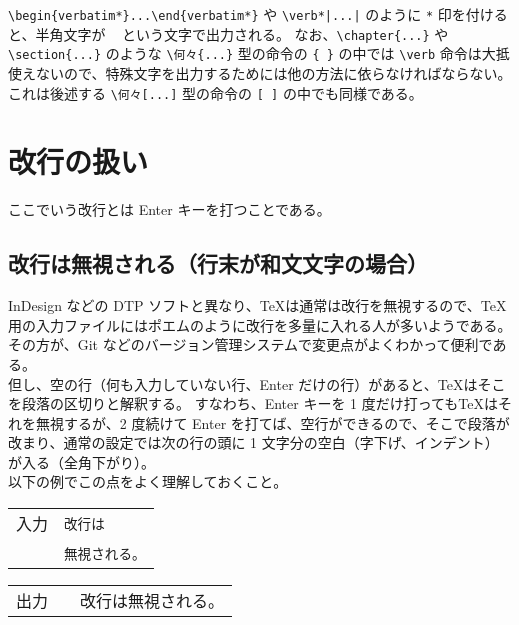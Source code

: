 \verb'\begin{verbatim*}...\end{verbatim*}' や \verb'\verb*|...|' のように \verb'*' 印を付けると、半角文字が \verb*' ' という文字で出力される。
なお、\verb'\chapter{...}' や \verb'\section{...}' のような \verb'\何々{...}' 型の命令の \verb'{ }' の中では \verb'\verb' 命令は大抵使えないので、特殊文字を出力するためには他の方法に依らなければならない。
これは後述する \verb'\何々[...]' 型の命令の \verb'[ ]' の中でも同様である。
\section{改行の扱い}
ここでいう改行とは Enter キーを打つことである。
\subsection{改行は無視される（行末が和文文字の場合）}
InDesign などの DTP ソフトと異なり、\TeX{}は通常は改行を無視するので、\TeX{}用の入力ファイルにはポエムのように改行を多量に入れる人が多いようである。
その方が、Git などのバージョン管理システムで変更点がよくわかって便利である。\\

但し、空の行（何も入力していない行、Enter だけの行）があると、\TeX{}はそこを段落の区切りと解釈する。
すなわち、Enter キーを 1 度だけ打っても\TeX{}はそれを無視するが、2 度続けて Enter を打てば、空行ができるので、そこで段落が改まり、通常の設定では次の行の頭に 1 文字分の空白（字下げ、インデント）が入る（全角下がり）。\\

以下の例でこの点をよく理解しておくこと。
\begin{longtable}[l]{@{}c|l@{}}
  入力 & \verb'改行は'        \\
  \    & \verb'無視される。'  \\
\end{longtable}
\begin{longtable}[l]{@{}c|l@{}}
  出力 & 　改行は無視される。 \\
\end{longtable}

